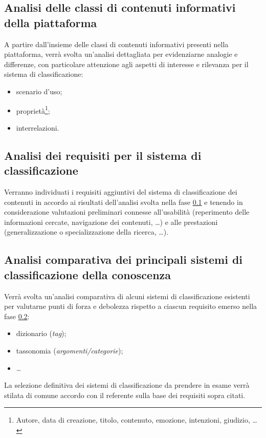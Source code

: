 \documentclass[10pt,a4paper,hidelinks]{scrartcl} %
\begin{document}
	\subsection{Analisi delle classi di contenuti informativi della piattaforma}
	\label{stage::workplan::1}
	A partire dall'insieme delle classi di contenuti informativi presenti nella piattaforma, verrà svolta un'analisi dettagliata per evidenziarne analogie e differenze, con particolare attenzione agli aspetti di interesse e rilevanza per il sistema di classificazione:
	\begin{itemize}
		\item scenario d'uso;
		\item proprietà\footnote{Autore, data di creazione, titolo, contenuto, emozione, intenzioni, giudizio, \ldots};
		\item interrelazioni.
	\end{itemize}

	\subsection{Analisi dei requisiti per il sistema di classificazione}
	\label{stage::workplan::2}
	Verranno individuati i requisiti aggiuntivi del sistema di classificazione dei contenuti in accordo ai risultati dell'analisi svolta nella fase \ref{stage::workplan::1} e tenendo in considerazione valutazioni preliminari connesse all'usabilità (reperimento delle informazioni cercate, navigazione dei contenuti, \ldots) e alle prestazioni (generalizzazione o specializzazione della ricerca, \ldots).

	\subsection{Analisi comparativa dei principali sistemi di classificazione della conoscenza}
	\label{stage::workplan::3}
	Verrà svolta un'analisi comparativa di alcuni sistemi di classificazione esistenti per valutarne punti di forza e debolezza rispetto a ciascun requisito emerso nella fase \ref{stage::workplan::2}:
	\begin{itemize}
		\item dizionario (\emph{tag});
		\item tassonomia (\emph{argomenti/categorie});
		\item \ldots
	\end{itemize}
	La selezione definitiva dei sistemi di classificazione da prendere in esame verrà stilata di comune accordo con il referente sulla base dei requisiti sopra citati.
\end{document}

